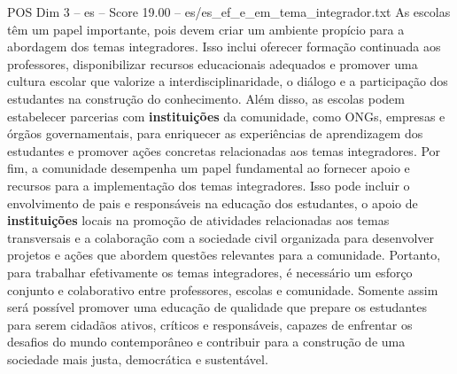 \begin{textsample}{POS Dim 3 – es – Score 19.00 – es/es\_ef\_e\_em\_tema\_integrador.txt}
As escolas têm um papel importante, pois devem criar um ambiente propício para a abordagem dos temas integradores.
Isso inclui oferecer formação continuada aos professores, disponibilizar recursos educacionais adequados e promover uma cultura escolar que valorize a interdisciplinaridade, o diálogo e a participação dos estudantes na construção do conhecimento.
Além disso, as escolas podem estabelecer parcerias com \textbf{instituições} da comunidade, como ONGs, empresas e órgãos governamentais, para enriquecer as experiências de aprendizagem dos estudantes e promover ações concretas relacionadas aos temas integradores.
Por fim, a comunidade desempenha um papel fundamental ao fornecer apoio e recursos para a implementação dos temas integradores.
Isso pode incluir o envolvimento de pais e responsáveis na educação dos estudantes, o apoio de \textbf{instituições} locais na promoção de atividades relacionadas aos temas transversais e a colaboração com a sociedade civil organizada para desenvolver projetos e ações que abordem questões relevantes para a comunidade.
Portanto, para trabalhar efetivamente os temas integradores, é necessário um esforço conjunto e colaborativo entre professores, escolas e comunidade.
Somente assim será possível promover uma educação de qualidade que prepare os estudantes para serem cidadãos ativos, críticos e responsáveis, capazes de enfrentar os desafios do mundo contemporâneo e contribuir para a construção de uma sociedade mais justa, democrática e sustentável.

\end{textsample}
